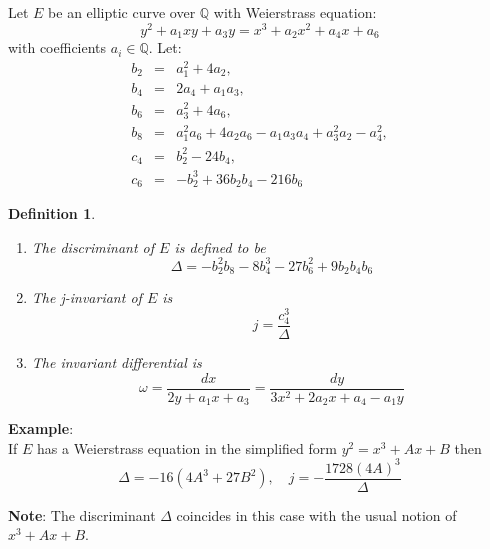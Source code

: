 \documentclass[12pt]{article}
\newtheorem{defn}{Definition}
\begin{document}
Let $E$ be an elliptic curve over $\mathbb{Q}$ with Weierstrass
equation:
$$y^2+a_1xy+a_3y=x^3+a_2x^2+a_4x+a_6$$
with coefficients $a_i\in\mathbb{Q}$. Let:
\begin{eqnarray}
\nonumber b_2 &=& a_1^2+4a_2,\\
\nonumber b_4 &=& 2a_4+a_1a_3,\\
\nonumber b_6 &=& a_3^2+4a_6,\\
\nonumber b_8 &=& a_1^2a_6+4a_2a_6-a_1a_3a_4+a_3^2a_2-a_4^2,\\
\nonumber c_4 &=& b_2^2-24b_4,\\
\nonumber c_6 &=& -b_2^3+36b_2b_4-216b_6
\end{eqnarray}
\begin{defn}\quad
\begin{enumerate}
\item The \emph{discriminant} of $E$ is defined to be
$$\Delta=-b_2^2b_8-8b_4^3-27b_6^2+9b_2b_4b_6$$

\item The \emph{j-invariant} of $E$ is
$$j=\frac{c_4^3}{\Delta}$$

\item The \emph{invariant differential} is
$$ \omega=\frac{dx}{2y+a_1x+a_3}=\frac{dy}{3x^2+2a_2x+a_4-a_1y}$$
\end{enumerate}
\end{defn}

{\bf Example}:\\

If $E$ has a Weierstrass equation in the simplified form
$y^2=x^3+Ax+B$ then $$ \Delta=-16(4A^3+27B^2),\quad
j=-\frac{1728(4A)^3}{\Delta}$$

{\bf Note}: The discriminant $\Delta$ coincides in this case with the usual notion of  $x^3+Ax+B$.
\end{document}
